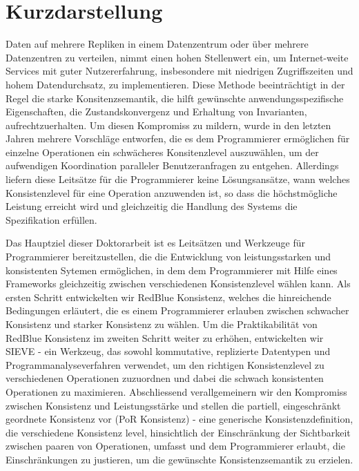\section*{Kurzdarstellung}
Daten auf mehrere Repliken in einem Datenzentrum oder 
{\" u}ber mehrere Datenzentren zu verteilen, nimmt einen hohen Stellenwert ein, um 
Internet-weite Services mit guter Nutzererfahrung, insbesondere mit niedrigen 
Zugriffszeiten und hohem Datendurchsatz, zu implementieren. Diese Methode beeintr{\"a}chtigt in der 
Regel die starke Konsitenzsemantik, die hilft gew{\"u}nschte anwendungsspezifische Eigenschaften, die 
Zustandskonvergenz und Erhaltung von Invarianten, aufrechtzuerhalten. Um diesen Kompromiss zu mildern, 
wurde in den letzten Jahren mehrere Vorschl{\"a}ge entworfen, die es dem Programmierer erm{\"o}glichen f{\"ur} 
einzelne Operationen ein schw{\"a}cheres Konsitenzlevel auszuw{\"a}hlen, um der aufwendigen Koordination paralleler 
Benutzeranfragen zu entgehen. Allerdings liefern diese Leits{\"a}tze f{\"u}r die Programmierer keine L{\"o}sungsans{\"a}tze, wann 
welches Konsistenzlevel f{\"u}r eine Operation anzuwenden ist, so dass die h{\"o}chstm{\"o}gliche Leistung erreicht wird und 
gleichzeitig die Handlung des Systems die Spezifikation erf{\"u}llen.

Das Hauptziel dieser Doktorarbeit ist es Leits{\"a}tzen und Werkzeuge f{\"u}r Programmierer bereitzustellen, 
die die Entwicklung von leistungsstarken und konsistenten Sytemen erm{\"o}glichen, in dem dem Programmierer mit Hilfe eines 
Frameworks gleichzeitig zwischen verschiedenen Konsistenzlevel w{\"a}hlen kann. Als ersten Schritt entwickelten wir RedBlue Konsistenz, 
welches die hinreichende Bedingungen erl{\"a}utert, die es einem Programmierer erlauben zwischen schwacher Konsistenz und starker 
Konsistenz zu w{\"a}hlen. Um die Praktikabilit{\"a}t von RedBlue Konsistenz im zweiten Schritt weiter zu erh{\"o}hen, entwickelten wir 
SIEVE - ein Werkzeug, das sowohl kommutative, replizierte Datentypen und Programmanalyseverfahren verwendet, um den richtigen 
Konsistenzlevel zu verschiedenen Operationen zuzuordnen und dabei die schwach konsistenten Operationen zu maximieren. 
Abschliessend verallgemeinern wir den Kompromiss zwischen Konsistenz und Leistungsst{\"a}rke und stellen die partiell, 
eingeschr{\"a}nkt geordnete Konsistenz vor (PoR Konsistenz) - eine generische Konsistenzdefinition, die verschiedene 
Konsistenz level, hinsichtlich der Einschr{\"a}nkung der Sichtbarkeit zwischen paaren von Operationen, umfasst und dem 
Programmierer erlaubt, die Einschr{\"a}nkungen zu justieren, um die gew{\"u}nschte Konsistenzsemantik zu erzielen. 
\cleardoublepage
